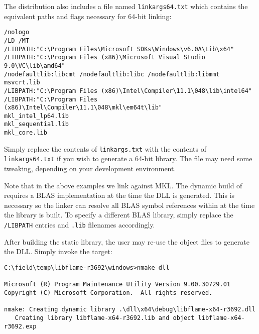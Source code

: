 \noindent
The \libflame distribution also includes a file named {\tt linkargs64.txt}
which contains the equivalent paths and flags necessary for 64-bit linking:

\begin{Verbatim}[frame=single,framesep=2.5mm,xleftmargin=5mm,fontsize=\footnotesize]
/nologo
/LD /MT 
/LIBPATH:"C:\Program Files\Microsoft SDKs\Windows\v6.0A\Lib\x64"
/LIBPATH:"C:\Program Files (x86)\Microsoft Visual Studio 9.0\VC\lib\amd64"
/nodefaultlib:libcmt /nodefaultlib:libc /nodefaultlib:libmmt
msvcrt.lib
/LIBPATH:"C:\Program Files (x86)\Intel\Compiler\11.1\048\lib\intel64"
/LIBPATH:"C:\Program Files (x86)\Intel\Compiler\11.1\048\mkl\em64t\lib"
mkl_intel_lp64.lib
mkl_sequential.lib
mkl_core.lib
\end{Verbatim}



\noindent
Simply replace the contents of {\tt linkargs.txt} with the contents of
{\tt linkargs64.txt} if you wish to generate a 64-bit library.
The file may need some tweaking, depending on your development environment.


Note that in the above examples we link against MKL.
The dynamic build of \libflame requires a BLAS implementation at the time
the DLL is generated.
This is necessary so the linker can resolve all BLAS symbol references within
\libflame at the time the library is built.
To specify a different BLAS library, simply replace the {\tt /LIBPATH} entries
and {\tt .lib} filenames accordingly.

After building the static library, the user may re-use the object files
to generate the DLL.
Simply invoke the \dll target:

\begin{Verbatim}[frame=single,framesep=2.5mm,xleftmargin=5mm,fontsize=\footnotesize]
C:\field\temp\libflame-r3692\windows>nmake dll

Microsoft (R) Program Maintenance Utility Version 9.00.30729.01
Copyright (C) Microsoft Corporation.  All rights reserved.

nmake: Creating dynamic library .\dll\x64\debug\libflame-x64-r3692.dll
   Creating library libflame-x64-r3692.lib and object libflame-x64-r3692.exp
\end{Verbatim}

